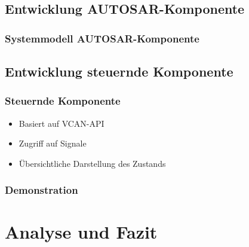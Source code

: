 \documentclass[]{beamer}
\newcommand{\inputImage}[1]{}
\begin{document}
\subsection{Entwicklung AUTOSAR-Komponente}
\begin{frame}
\frametitle{Systemmodell AUTOSAR-Komponente}
    \begin{figure}[ht]
        \centering
        \resizebox{\linewidth}{!}{\inputImage{SMLS_Modell.dia}}
        \label{fig:smls_modell}
    \end{figure}
\end{frame}




\subsection{Entwicklung steuernde Komponente}
\begin{frame}
\frametitle{Steuernde Komponente}
    \begin{itemize}
        \item Basiert auf VCAN-API
        \item Zugriff auf Signale
        \item Übersichtliche Darstellung des Zustands
    \end{itemize}
\end{frame}

\begin{frame}
\frametitle{Demonstration}

\end{frame}





\section{Analyse und Fazit}
\label{sec:analyse_fazit}

\end{document}
